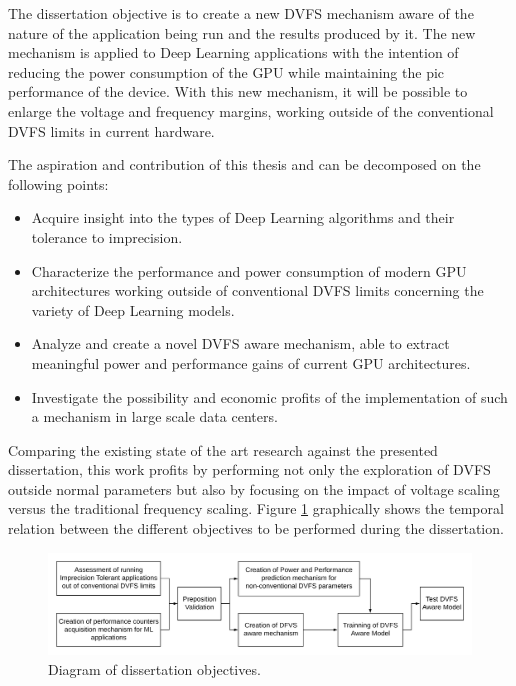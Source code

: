 The dissertation objective is to create a new DVFS mechanism aware of the nature of the application being run and the results produced by it. The new mechanism is applied to Deep Learning applications with the intention of reducing the power consumption of the GPU while maintaining the pic performance of the device. With this new mechanism, it will be possible to enlarge the voltage and frequency margins, working outside of the conventional DVFS limits in current hardware. 


The aspiration and contribution of this thesis and can be decomposed on the following points:
\begin{itemize}
\item Acquire insight into the types of Deep Learning algorithms and their tolerance to imprecision.
\item Characterize the performance and power consumption of modern GPU architectures working outside of conventional DVFS limits concerning the variety of Deep Learning models.
\item Analyze and create a novel DVFS aware mechanism, able to extract meaningful power and performance gains of current GPU architectures.
\item Investigate the possibility and economic profits of the implementation of such a mechanism in large scale data centers.
\end{itemize}

Comparing the existing state of the art research against the presented dissertation, this work profits by performing not only the exploration of DVFS outside normal parameters but also by focusing on the impact of voltage scaling versus the traditional frequency scaling.  Figure \ref{fig:thesisObj} graphically shows the temporal relation between the different objectives to be performed during the dissertation.


\begin{figure}[!htb]
  \centering
  \includegraphics[width=1\textwidth]{Figures/Introduction/Dissertation_Objectives.png}
  \caption{Diagram of dissertation objectives.}
  \label{fig:thesisObj}
\end{figure}

